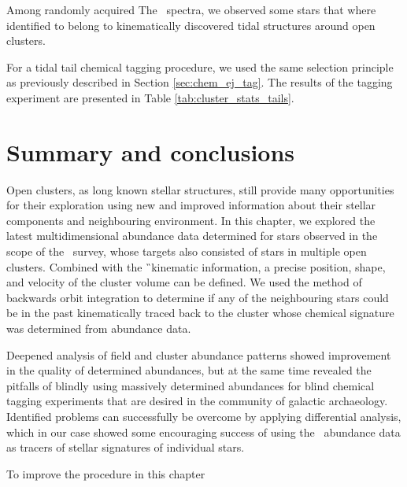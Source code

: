 Among randomly acquired The \Gh\ spectra, we observed some stars that where identified to belong to kinematically discovered tidal structures around open clusters.

For a tidal tail chemical tagging procedure, we used the same selection principle as previously described in Section \ref{sec:chem_ej_tag}. The results of the tagging experiment are presented in Table \ref{tab:cluster_stats_tails}.

\section{Summary and conclusions}
\label{sec:clusters_summary_conclusions}
Open clusters, as long known stellar structures, still provide many opportunities for their exploration using new and improved information about their stellar components and neighbouring environment. In this chapter, we explored the latest multidimensional abundance data determined for stars observed in the scope of the \Gh\ survey, whose targets also consisted of stars in multiple open clusters. Combined with the \G\ kinematic information, a precise position, shape, and velocity of the cluster volume can be defined. We used the method of backwards orbit integration to determine if any of the neighbouring stars could be in the past kinematically traced back to the cluster whose chemical signature was determined from abundance data.

Deepened analysis of field and cluster abundance patterns showed improvement in the quality of determined abundances, but at the same time revealed the pitfalls of blindly using massively determined abundances for blind chemical tagging experiments that are desired in the community of galactic archaeology. Identified problems can successfully be overcome by applying differential analysis, which in our case showed some encouraging success of using the \Gh\ abundance data as tracers of stellar signatures of individual stars.

To improve the procedure in this chapter